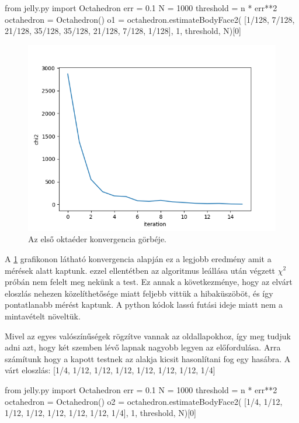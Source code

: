 \begin{python}
from jelly.py import Octahedron
err = 0.1
N = 1000
threshold = n * err**2
octahedron = Octahedron()
o1 = octahedron.estimateBodyFace2(
     [1/128, 7/128, 21/128, 35/128, 35/128, 21/128, 7/128, 1/128],
     1, threshold, N)[0]
\end{python}

\begin{figure}[h!]
	\centering
	\includegraphics[scale=0.7]{images/octahedron_01.png}
	\caption{Az első oktaéder konvergencia görbéje.}
	\label{fig:octa01}
\end{figure}

A \ref{fig:octa01} grafikonon látható konvergencia alapján ez a legjobb eredmény amit a mérések alatt kaptunk.
ezzel ellentétben az algoritmus leállása után végzett $\chi^2$ próbán nem felelt meg nekünk a test.
Ez annak a következménye, hogy az elvárt eloszlás nehezen közelíthetősége miatt feljebb vittük a hibaküszöböt, és így pontatlanabb mérést kaptunk.
A python kódok lassú futási ideje miatt nem a mintavételt növeltük.

Mivel az egyes valószínűségek rögzítve vannak az oldallapokhoz, így meg tudjuk adni azt, hogy két szemben lévő lapnak nagyobb legyen az előfordulása.
Arra számítunk hogy a kapott testnek az alakja kicsit hasonlítani fog egy hasábra.
A várt eloszlás: [1/4, 1/12, 1/12, 1/12, 1/12, 1/12, 1/12, 1/4]

\begin{python}
from jelly.py import Octahedron
err = 0.1
N = 1000
threshold = n * err**2
octahedron = Octahedron()
o2 = octahedron.estimateBodyFace2(
     [1/4, 1/12, 1/12, 1/12, 1/12, 1/12, 1/12, 1/4],
     1, threshold, N)[0]
\end{python}

